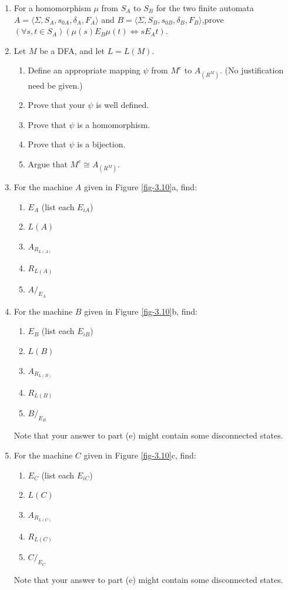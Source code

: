 \begin{enumerate}[{3.}1. ]
\item For a homomorphism $\mu$ from $S_A$ to $S_B$ for the two finite automata
$A=\langle\Sigma,S_A,s_{0A},\delta_A,F_A\rangle$ and
$B=\langle\Sigma,S_B,s_{0B},\delta_B,F_B\rangle$,prove
$(\forall s,t \in S_A)(\mu(s) E_B \mu(t) \Leftrightarrow s E_A t)$.

\item Let $M$ be a DFA, and let $L=L(M)$.
\begin{enumerate}
\item Define an appropriate mapping $\psi$ from $M^c$ to $A_{(R^M)}$. (No justification need
be given.)
\item Prove that your $\psi$ is well defined.
\item Prove that $\psi$ is a homomorphism.
\item Prove that $\psi$ is a bijection.
\item Argue that $M^c \cong A_{(R^M)}$.
\end{enumerate}

\item For the machine $A$ given in Figure \ref{fig-3.10}a, find:
\begin{enumerate}
\item $E_A$ (list each $E_{iA}$)
\item $L(A)$
\item $A_{R_{L(A)}}$
\item $R_{L(A)}$
\item $A/_{E_A}$
\end{enumerate}

\item For the machine $B$ given in Figure \ref{fig-3.10}b, find:
\begin{enumerate}
\item $E_B$ (list each $E_{iB}$)
\item $L(B)$
\item $A_{R_{L(B)}}$
\item $R_{L(B)}$
\item $B/_{E_B}$
\end{enumerate}
Note that your answer to part (e) might contain some disconnected states.

\item For the machine $C$ given in Figure \ref{fig-3.10}c, find:
\begin{enumerate}
\item $E_C$ (list each $E_{iC}$)
\item $L(C)$
\item $A_{R_{L(C)}}$
\item $R_{L(C)}$
\item $C/_{E_C}$
\end{enumerate}
Note that your answer to part (e) might contain some disconnected states.


\end{enumerate}
